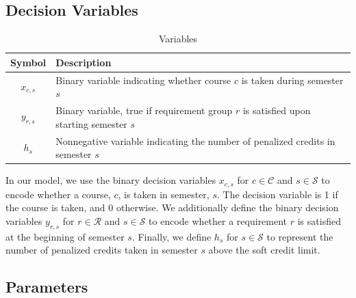 \documentclass[12pt]{article}
\renewcommand{\S}{\mathcal{S}}
\renewcommand{\R}{\mathcal{R}}
\renewcommand{\C}{\mathcal{C}}
\begin{document}
\subsection{Decision Variables}
\begin{table}[H]
    \centering
    \begin{tabular}{c|l}
        \hline 
        \textbf{Symbol} &  \textbf{Description} \\
        \hline 
         $x_{c,s}$&  Binary variable indicating whether course $c$ is taken during semester $s$\\ 
         $y_{r,s}$& Binary variable, true if requirement group $r$ is satisfied upon starting semester $s$ \\ 
         $h_s$ & Nonnegative variable indicating the number of penalized credits in semester $s$
    \end{tabular}
    \caption{Variables}
    \label{tab:variables}
\end{table}

In our model, we use the binary decision variables $x_{c,s}$ for $c\in\C$ and $s\in\S$ to encode whether a course, $c$, is taken in semester, $s$. The decision variable is 1 if the course is taken, and 0 otherwise.
We additionally define the binary decision variables $y_{r,s}$ for $r\in\R$ and $s\in\S$ to encode whether a requirement $r$ is satisfied at the beginning of semester $s$.
Finally, we define $h_s$ for $s\in\S$ to represent the number of penalized credits taken in semester $s$ above the soft credit limit.

\subsection{Parameters}
\end{document}
